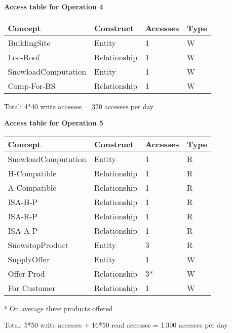 \vspace{12px}

{\centering \textbf{Access table for Operation 4}\\}
\begin{table}[H]
  \def\arraystretch{1.10}%
  \centering
  \begin{tabular}{ | m{4cm} | m{4cm}| m{3cm} | m{2cm} |}
    \hline
    {\textbf{\large Concept}} & {\textbf{\large Construct}} & {\textbf{\large Accesses}} & {\textbf{\large Type}} \\
    \hline
    \color[HTML]{3531FF} BuildingSite & Entity & 1 & W \\
    \hline
    \color[HTML]{3531FF} Loc-Roof & Relationship & 1 & W \\
    \hline
    \color[HTML]{3531FF} SnowloadComputation & Entity & 1 & W \\
    \hline
    \color[HTML]{3531FF} Comp-For-BS & Relationship & 1 & W \\
    \hline
  \end{tabular}
\end{table}
Total: 4*40 write accesses = 320 accesses per day

\vspace{12px}

{\centering \textbf{Access table for Operation 5}\\}
\begin{table}[H]
  \def\arraystretch{1.10}%
  \centering
  \begin{tabular}{ | m{4cm} | m{4cm}| m{3cm} | m{2cm} |}
    \hline
    {\textbf{\large Concept}} & {\textbf{\large Construct}} & {\textbf{\large Accesses}} & {\textbf{\large Type}} \\
    \hline
    \color[HTML]{3531FF} SnowloadComputation & Entity & 1 & R \\
    \hline
    \color[HTML]{3531FF} H-Compatible & Relationship & 1 & R \\
    \hline
    \color[HTML]{3531FF} A-Compatible & Relationship & 1 & R \\
    \hline
    \color[HTML]{3531FF} ISA-H-P & Relationship & 1 & R \\
    \hline
    \color[HTML]{3531FF} ISA-R-P  & Relationship & 1 & R \\
    \hline
    \color[HTML]{3531FF} ISA-A-P  & Relationship & 1 & R \\
    \hline
    \color[HTML]{3531FF} SnowstopProduct & Entity & 3 & R \\
    \hline
    \color[HTML]{3531FF} SupplyOffer & Entity & 1 & W \\
    \hline
    \color[HTML]{3531FF} Offer-Prod & Relationship & 3* & W \\
    \hline
    \color[HTML]{3531FF} For Customer & Relationship & 1 & W \\
    \hline
  \end{tabular}
  \small{* On average three products offered}
\end{table}
Total: 5*50 write accesses + 16*50 read accesses = 1.300 accesses per day


